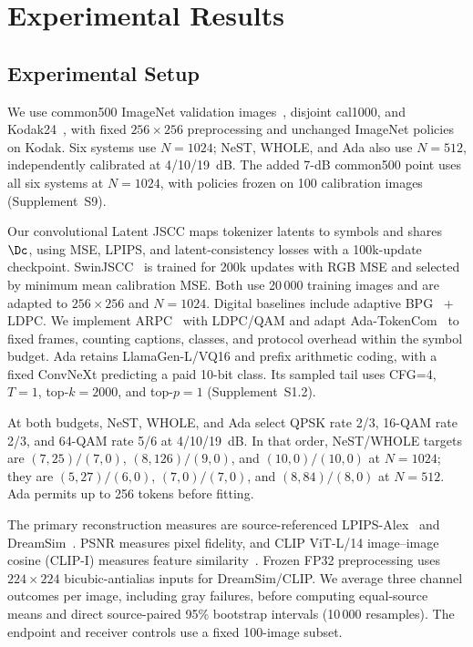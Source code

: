 \section{Experimental Results}
\ifCLASSOPTIONonecolumn\fi
\subsection{Experimental Setup}
We use common500 ImageNet validation images~\cite{imagenet}, disjoint cal1000, and Kodak24~\cite{kodak}, with fixed $256\times256$ preprocessing and unchanged ImageNet policies on Kodak. Six systems use $N=1024$; NeST, WHOLE, and Ada also use $N=512$, independently calibrated at 4/10/19~dB. The added 7-dB common500 point uses all six systems at $N=1024$, with policies frozen on 100 calibration images (Supplement~S9).

Our convolutional Latent JSCC maps tokenizer latents to symbols and shares $\Dc$, using MSE, LPIPS, and latent-consistency losses with a 100k-update checkpoint. SwinJSCC~\cite{swinjscc} is trained for 200k updates with RGB MSE and selected by minimum mean calibration MSE. Both use 20\,000 training images and are adapted to $256\times256$ and $N=1024$. Digital baselines include adaptive BPG~\cite{bpg} + LDPC. We implement ARPC~\cite{arpc} with LDPC/QAM and adapt Ada-TokenCom~\cite{adatokencom} to fixed frames, counting captions, classes, and protocol overhead within the symbol budget. Ada retains LlamaGen-L/VQ16 and prefix arithmetic coding, with a fixed ConvNeXt predicting a paid 10-bit class. Its sampled tail uses CFG=4, $T=1$, top-$k=2000$, and top-$p=1$ (Supplement~S1.2).

At both budgets, NeST, WHOLE, and Ada select QPSK rate 2/3, 16-QAM rate 2/3, and 64-QAM rate 5/6 at 4/10/19~dB. In that order, NeST/WHOLE targets are $(7,25)/(7,0)$, $(8,126)/(9,0)$, and $(10,0)/(10,0)$ at $N=1024$; they are $(5,27)/(6,0)$, $(7,0)/(7,0)$, and $(8,84)/(8,0)$ at $N=512$. Ada permits up to 256 tokens before fitting.

The primary reconstruction measures are source-referenced LPIPS-Alex~\cite{lpips} and DreamSim~\cite{dreamsim}. PSNR measures pixel fidelity, and CLIP ViT-L/14 image--image cosine (CLIP-I) measures feature similarity~\cite{clip}. Frozen FP32 preprocessing uses $224\times224$ bicubic-antialias inputs for DreamSim/CLIP. We average three channel outcomes per image, including gray failures, before computing equal-source means and direct source-paired 95\% bootstrap intervals (10\,000 resamples). The endpoint and receiver controls use a fixed 100-image subset.

